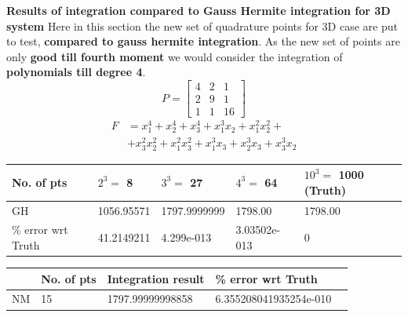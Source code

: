 \documentclass[landscape]{slides}
\begin{document}
\begin{slide}
{\bf Results of integration compared to Gauss Hermite integration for 3D system}\newline\newline
Here in this section the new set of quadrature points for 3D case are put to test, {\bf compared to gauss hermite integration}. As the new set of points are only {\bf good till fourth moment} we would consider the integration of {\bf polynomials till degree 4}.\newline
\[
 P = \begin{bmatrix}
       4 & 2 & 1    \\
       2 & 9 & 1     \\
       1 & 1 & 16
     \end{bmatrix}
\]
\begin{align*}
F&=x_1^4+x_2^4+x_3^4+x_1^3x_2+x_1^2x_2^2+\\
 &+x_3^2x_2^2+x_1^2x_3^2+x_1^3x_3+x_2^3x_3+x_3^3x_2
\end{align*}
\tiny
\begin{center}
  \begin{tabular}{ | l | l | l | l | l | }
    \hline
       No. of pts 					& $2^3=$ 8 							& $3^3=$ 27 			  & $4^3=$ 64			 & $10^3=$ 1000 (Truth) \\ \hline 
      GH          					&   1056.95571  			  & 1797.9999999      & 1798.00     	 &   1798.00           \\ \hline
\% error wrt Truth       	  &   41.2149211    			&  4.299e-013  	  	& 3.03502e-013   &   0         \\ 
      \hline
  \end{tabular}
\end{center} 

\begin{center}
  \begin{tabular}{ | l | l | l | l | l | }
    \hline
                  					&   No. of pts			& Integration result 			  & \% error wrt Truth			 \\ \hline 
      NM          					&   15       			  & 1797.99999998858          & 6.355208041935254e-010   \\
      \hline
  \end{tabular}
\end{center}
   	\end{slide}
\end{document}
